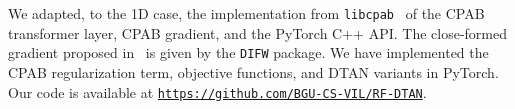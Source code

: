 We adapted, to the 1D case, the implementation from \texttt{libcpab}~\cite{Detlefsen:2018:libcpab}
of the CPAB transformer layer, CPAB gradient, and the PyTorch C++ API. The close-formed gradient proposed in~\cite{Martinez:ICML:2022:closed} is given by the \texttt{DIFW} package.
We have implemented the CPAB regularization term, objective functions, and DTAN variants in PyTorch.
 Our code is available at 
\href{https://github.com/BGU-CS-VIL/RF-DTAN}{
 \texttt{https://github.com/BGU-CS-VIL/RF-DTAN}}.